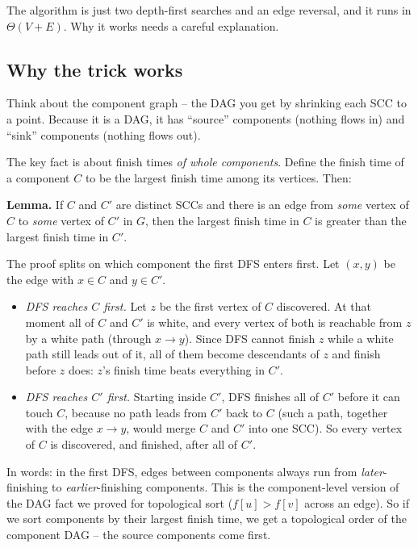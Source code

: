 The algorithm is just two depth-first searches and an edge reversal, and it runs
in $\Theta(V + E)$. Why it works needs a careful explanation.

\subsection{Why the trick works}

Think about the component graph -- the DAG you get by shrinking each SCC to a
point. Because it is a DAG, it has ``source'' components (nothing flows in) and
``sink'' components (nothing flows out).

The key fact is about finish times \emph{of whole components}. Define the finish
time of a component $C$ to be the largest finish time among its vertices. Then:

\begin{formalbox}
\textbf{Lemma.} If $C$ and $C'$ are distinct SCCs and there is an edge from
\emph{some} vertex of $C$ to \emph{some} vertex of $C'$ in $G$, then the largest
finish time in $C$ is greater than the largest finish time in $C'$.
\end{formalbox}

The proof splits on which component the first DFS enters first. Let $(x, y)$ be
the edge with $x \in C$ and $y \in C'$.
\begin{itemize}
  \item \emph{DFS reaches $C$ first.} Let $z$ be the first vertex of $C$
  discovered. At that moment all of $C$ and $C'$ is white, and every vertex of
  both is reachable from $z$ by a white path (through $x \to y$). Since DFS cannot
  finish $z$ while a white path still leads out of it, all of them become
  descendants of $z$ and finish before $z$ does: $z$'s finish time beats
  everything in $C'$.
  \item \emph{DFS reaches $C'$ first.} Starting inside $C'$, DFS finishes all of
  $C'$ before it can touch $C$, because no path leads from $C'$ back to $C$ (such
  a path, together with the edge $x \to y$, would merge $C$ and $C'$ into one
  SCC). So every vertex of $C$ is discovered, and finished, after all of $C'$.
\end{itemize}

In words: in the first DFS, edges between components always run from
\emph{later}-finishing to \emph{earlier}-finishing components. This is the
component-level version of the DAG fact we proved for topological sort ($f[u] >
f[v]$ across an edge). So if we sort components by their largest finish time, we
get a topological order of the component DAG -- the source components come first.

